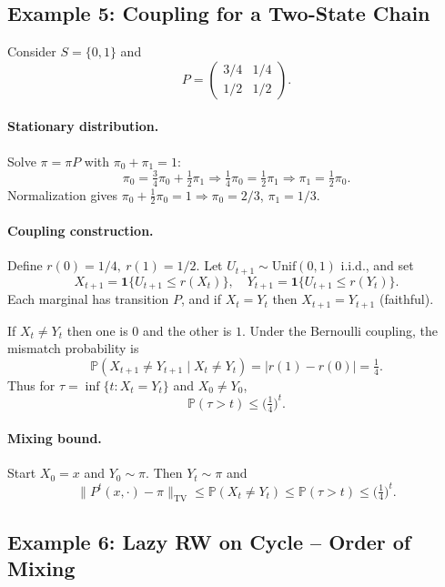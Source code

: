 \documentclass[answers,12pt,addpoints]{exam}
\begin{document}

\subsection*{Example 5: Coupling for a Two-State Chain}

Consider $S=\{0,1\}$ and
\[
P = \begin{pmatrix}
3/4 & 1/4\\
1/2 & 1/2
\end{pmatrix}.
\]

\paragraph{Stationary distribution.}
Solve $\pi=\pi P$ with $\pi_0+\pi_1=1$:
\[
\pi_0 = \tfrac34\pi_0 + \tfrac12\pi_1 \Rightarrow \tfrac14\pi_0 = \tfrac12\pi_1 \Rightarrow \pi_1 = \tfrac12\pi_0.
\]
Normalization gives $\pi_0 + \tfrac12\pi_0 = 1 \Rightarrow \pi_0=2/3$, $\pi_1=1/3$.

\paragraph{Coupling construction.}
Define $r(0)=1/4,\ r(1)=1/2$. Let $U_{t+1}\sim\mathrm{Unif}(0,1)$ i.i.d., and set
\[
X_{t+1} = \mathbf{1}\{U_{t+1}\le r(X_t)\},\quad
Y_{t+1} = \mathbf{1}\{U_{t+1}\le r(Y_t)\}.
\]
Each marginal has transition $P$, and if $X_t=Y_t$ then $X_{t+1}=Y_{t+1}$ (faithful).

If $X_t\neq Y_t$ then one is $0$ and the other is $1$. Under the Bernoulli coupling, the mismatch probability is
\[
\mathbb{P}(X_{t+1}\neq Y_{t+1}\mid X_t\neq Y_t) = |r(1)-r(0)| = \tfrac14.
\]
Thus for $\tau=\inf\{t:X_t=Y_t\}$ and $X_0\neq Y_0$,
\[
\mathbb{P}(\tau>t)\le \Big(\tfrac14\Big)^t.
\]

\paragraph{Mixing bound.}
Start $X_0=x$ and $Y_0\sim\pi$. Then $Y_t\sim\pi$ and
\[
\|P^t(x,\cdot)-\pi\|_\mathrm{TV}\le \mathbb{P}(X_t\neq Y_t)\le \mathbb{P}(\tau>t)\le \Big(\tfrac14\Big)^t.
\]


\subsection*{Example 6: Lazy RW on Cycle – Order of Mixing}
\end{document}

